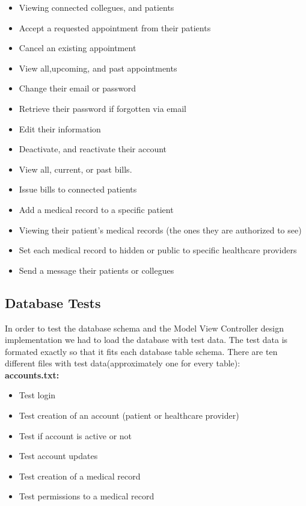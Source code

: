 \documentclass[12pt]{report}
\begin{document}
\begin{itemize}
\begin{itemize}
\item Viewing connected collegues, and patients
\item Accept a requested appointment from their patients
\item Cancel an existing appointment
\item View all,upcoming, and past appointments
\item Change their email or password
\item Retrieve their password if forgotten via email
\item Edit their information
\item Deactivate, and reactivate their account
\item View all, current, or past bills.
\item Issue bills to connected patients
\item Add a medical record to a specific patient
\item Viewing their patient's medical records (the ones they are authorized to see)
\item Set each medical record to hidden or public to specific healthcare providers
\item Send a message their patients or collegues
\end{itemize}

\subsection{Database Tests}

In order to test the database schema and the Model View Controller design implementation we had to load the database with test data.  The test data is formated exactly so that it fits each database table schema.  There are ten different files with test data(approximately one for every table):\\

\textbf{accounts.txt:}
\begin{itemize}
\item Test login
\item Test creation of an account (patient or healthcare provider)
\item Test if account is active or not
\item Test account updates
\item Test creation of a medical record
\item Test permissions to a medical record
\end{itemize}


\end{itemize}
\end{document}
